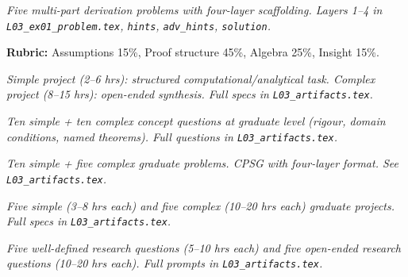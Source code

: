\begin{tcolorbox}[ugprobbox, title={CPSU · L03 · Tier 3 · 3–6 hrs (4-layer)}]
\textit{Five multi-part derivation problems with four-layer scaffolding.
Layers 1–4 in \texttt{L03_ex01\_problem.tex}, \texttt{hints}, \texttt{adv\_hints}, \texttt{solution}.}

\textbf{Rubric:} Assumptions 15\%, Proof structure 45\%, Algebra 25\%, Insight 15\%.
\end{tcolorbox}

\begin{tcolorbox}[ugprobbox, title={SPJU + CPJU · L03 · Tiers 2–3}]
\textit{Simple project (2–6 hrs): structured computational/analytical task.
Complex project (8–15 hrs): open-ended synthesis.
Full specs in \texttt{L03_artifacts.tex}.}
\end{tcolorbox}

\begin{tcolorbox}[gradconceptbox, title={SCQG + CCQG · L03 · Tiers 4–5}]
\textit{Ten simple + ten complex concept questions at graduate level (rigour, domain
conditions, named theorems). Full questions in \texttt{L03_artifacts.tex}.}
\end{tcolorbox}

\begin{tcolorbox}[gradprobbox, title={SPSG + CPSG · L03 · Tiers 4–5}]
\textit{Ten simple + five complex graduate problems.
CPSG with four-layer format. See \texttt{L03_artifacts.tex}.}
\end{tcolorbox}

\begin{tcolorbox}[gradprobbox, title={SPJG (×5) + CPJG (×5) · L03 · Tiers 4–5}]
\textit{Five simple (3–8 hrs each) and five complex (10–20 hrs each) graduate projects.
Full specs in \texttt{L03_artifacts.tex}.}
\end{tcolorbox}

\begin{tcolorbox}[researchbox, title={WRQ (×5) + ORQ (×5) · L03 · Tiers 4–5}]
\textit{Five well-defined research questions (5–10 hrs each) and five open-ended
research questions (10–20 hrs each). Full prompts in \texttt{L03_artifacts.tex}.}
\end{tcolorbox}
